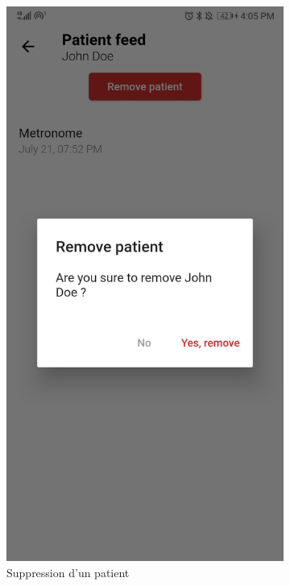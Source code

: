 \begin{appendices}
\begin{landscape}
\begin{figure}[h]
  \begin{subfigure}{.25\textwidth}
    \centering
    \includegraphics[width=.75\linewidth]{content/imgs/screen19.jpg}
    \caption{Suppression d'un patient}
    \label{appendix:screen_therapist4}
  \end{subfigure}%
  \begin{subfigure}{.25\textwidth}
    \centering

\end{subfigure}
\end{figure}
\end{landscape}
\end{appendices}
